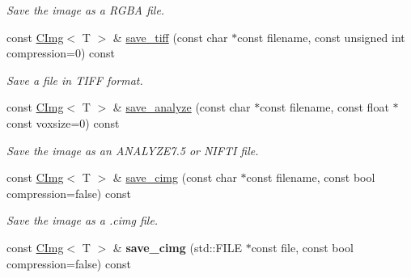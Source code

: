\begin{DoxyCompactItemize}
\begin{DoxyCompactList}\small\item\em Save the image as a RGBA file. \item\end{DoxyCompactList}\item 
const \hyperlink{structcimg__library_1_1CImg}{CImg}$<$ T $>$ \& \hyperlink{structcimg__library_1_1CImg_ad17e8b00c13b9724696b2bd3d2f7cf7b}{save\_\-tiff} (const char $\ast$const filename, const unsigned int compression=0) const 
\begin{DoxyCompactList}\small\item\em Save a file in TIFF format. \item\end{DoxyCompactList}\item 
\hypertarget{structcimg__library_1_1CImg_a469c8bebf15e1247b789b35b79ea1537}{
const \hyperlink{structcimg__library_1_1CImg}{CImg}$<$ T $>$ \& \hyperlink{structcimg__library_1_1CImg_a469c8bebf15e1247b789b35b79ea1537}{save\_\-analyze} (const char $\ast$const filename, const float $\ast$const voxsize=0) const }
\label{structcimg__library_1_1CImg_a469c8bebf15e1247b789b35b79ea1537}

\begin{DoxyCompactList}\small\item\em Save the image as an ANALYZE7.5 or NIFTI file. \item\end{DoxyCompactList}\item 
\hypertarget{structcimg__library_1_1CImg_af6ece7105ee30879a1bf42dbad8ede77}{
const \hyperlink{structcimg__library_1_1CImg}{CImg}$<$ T $>$ \& \hyperlink{structcimg__library_1_1CImg_af6ece7105ee30879a1bf42dbad8ede77}{save\_\-cimg} (const char $\ast$const filename, const bool compression=false) const }
\label{structcimg__library_1_1CImg_af6ece7105ee30879a1bf42dbad8ede77}

\begin{DoxyCompactList}\small\item\em Save the image as a .cimg file. \item\end{DoxyCompactList}\item 
\hypertarget{structcimg__library_1_1CImg_a48902db85a9a7ba7ff3ac08827d753c5}{
const \hyperlink{structcimg__library_1_1CImg}{CImg}$<$ T $>$ \& {\bfseries save\_\-cimg} (std::FILE $\ast$const file, const bool compression=false) const }
\label{structcimg__library_1_1CImg_a48902db85a9a7ba7ff3ac08827d753c5}


\end{DoxyCompactItemize}
